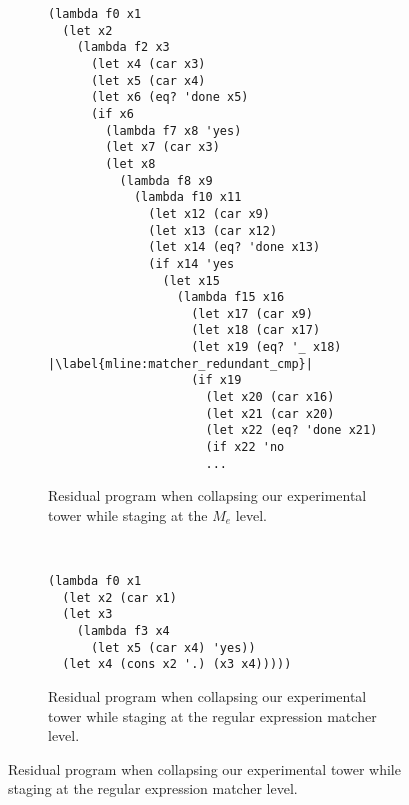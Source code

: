 \documentclass[a4paper,12pt,twoside,openright]{report}
\theoremstyle{definition}
\newcommand{\mevl}{$M_{e}$}
\begin{document}
\begin{figure}[htp!]
\centering
    \begin{subfigure}{\linewidth}
        \centering
        \begin{verbatim}
(lambda f0 x1
  (let x2
    (lambda f2 x3
      (let x4 (car x3)
      (let x5 (car x4)
      (let x6 (eq? 'done x5)
      (if x6
        (lambda f7 x8 'yes)
        (let x7 (car x3)
        (let x8
          (lambda f8 x9
            (lambda f10 x11
              (let x12 (car x9)
              (let x13 (car x12)
              (let x14 (eq? 'done x13)
              (if x14 'yes
                (let x15
                  (lambda f15 x16
                    (let x17 (car x9)
                    (let x18 (car x17)
                    (let x19 (eq? '_ x18) |\label{mline:matcher_redundant_cmp}|
                    (if x19
                      (let x20 (car x16)
                      (let x21 (car x20)
                      (let x22 (eq? 'done x21)
                      (if x22 'no
                      ...
        \end{verbatim}
        \caption{Residual program when collapsing our experimental tower while staging at the \mevl{} level.}
        \label{lst:mevl_staged_regexp}
    \end{subfigure}
    \\[1ex]
    \par\bigskip
    \begin{subfigure}{\linewidth}
        \centering
        \begin{verbatim}
(lambda f0 x1
  (let x2 (car x1)
  (let x3
    (lambda f3 x4
      (let x5 (car x4) 'yes))
  (let x4 (cons x2 '.) (x3 x4)))))
        \end{verbatim}
        \caption{Residual program when collapsing our experimental tower while staging at the regular expression matcher level.}
        \label{lst:mevl_regexp_staged}
    \end{subfigure}
\end{figure}
\newpage

\end{document}

